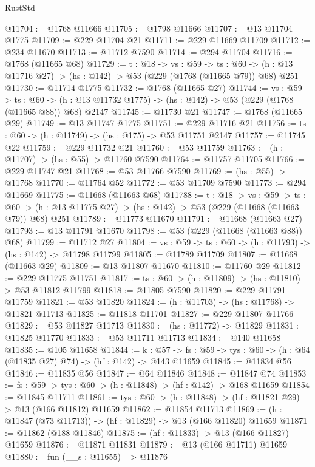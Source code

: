 \begin{lexlean}{RustStd}
\begin{coremodule}
@11704 := @1768 @11666
@11705 := @1798 @11666
@11707 := @13 @11704 @1775
@11709 := @229 @11704 @21
@11711 := @229 @11669 @11709
@11712 := @234 @11670
@11713 := @11712 @7590
@11714 := @294 @11704
@11716 := @1768 (@11665 @68)
@11729 := {t : @18} ->
  {vs : @59} ->
  {ts : @60} -> (h : @13 @11716 @27) -> (hs : @142) -> @53 (@229 (@1768 (@11665 @79)) @68) @251
@11730 := @11714 @1775
@11732 := @1768 (@11665 @27)
@11744 := {vs : @59} ->
  {ts : @60} -> (h : @13 @11732 @1775) -> (hs : @142) -> @53 (@229 (@1768 (@11665 @88)) @68) @2147
@11745 := @11730 @21
@11747 := @1768 (@11665 @29)
@11749 := @13 @11747 @1775
@11751 := @229 @11716 @21
@11756 := {ts : @60} -> (h : @11749) -> (hs : @175) -> @53 @11751 @2147
@11757 := @11745 @22
@11759 := @229 @11732 @21
@11760 := @53 @11759
@11763 := (h : @11707) -> (hs : @55) -> @11760 @7590
@11764 := @11757 @11705
@11766 := @229 @11747 @21
@11768 := @53 @11766 @7590
@11769 := (hs : @55) -> @11768
@11770 := @11764 @52
@11772 := @53 @11709 @7590
@11773 := @294 @11669
@11775 := @11668 (@11663 @68)
@11788 := {t : @18} ->
  {vs : @59} ->
  {ts : @60} -> (h : @13 @11775 @27) -> (hs : @142) -> @53 (@229 (@11668 (@11663 @79)) @68) @251
@11789 := @11773 @11670
@11791 := @11668 (@11663 @27)
@11793 := @13 @11791 @11670
@11798 := @53 (@229 (@11668 (@11663 @88)) @68)
@11799 := @11712 @27
@11804 := {vs : @59} -> {ts : @60} -> (h : @11793) -> (hs : @142) -> @11798 @11799
@11805 := @11789 @11709
@11807 := @11668 (@11663 @29)
@11809 := @13 @11807 @11670
@11810 := @11760 @29
@11812 := @229 @11775 @11751
@11817 := {ts : @60} -> (h : @11809) -> (hs : @11810) -> @53 @11812 @11799
@11818 := @11805 @7590
@11820 := @229 @11791 @11759
@11821 := @53 @11820
@11824 := (h : @11703) -> (hs : @11768) -> @11821 @11713
@11825 := @11818 @11701
@11827 := @229 @11807 @11766
@11829 := @53 @11827 @11713
@11830 := (hs : @11772) -> @11829
@11831 := @11825 @11770
@11833 := @53 @11711 @11713
@11834 := @140 @11658
@11835 := @105 @11658
@11844 := {k : @57} ->
  {fs : @59} -> {tys : @60} -> (h : @64 (@11835 @27) @74) -> (hf : @142) -> @143 @11659
@11845 := @11834 @56
@11846 := @11835 @56
@11847 := @64 @11846
@11848 := @11847 @74
@11853 := {fs : @59} -> {tys : @60} -> (h : @11848) -> (hf : @142) -> @168 @11659
@11854 := @11845 @11711
@11861 := {tys : @60} -> (h : @11848) -> (hf : @11821 @29) -> @13 (@166 @11812) @11659
@11862 := @11854 @11713
@11869 := (h : @11847 (@73 @11713)) -> (hf : @11829) -> @13 (@166 @11820) @11659
@11871 := @11862 (@188 @11846)
@11875 := (hf : @11833) -> @13 (@166 @11827) @11659
@11876 := @11871 @11831
@11879 := @13 (@166 @11711) @11659
@11880 := fun (__s : @11655) => @11876

\end{coremodule}
\end{lexlean}
